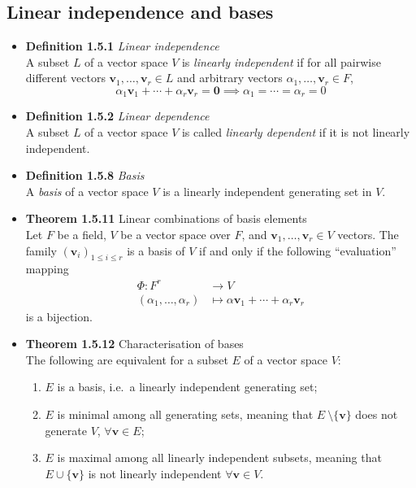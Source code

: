 \documentclass[11pt,a4paper]{article}
\begin{document}
\subsection{Linear independence and bases}

\begin{itemize}

    \item \textbf{Definition 1.5.1} \emph{Linear independence} \\
        A subset $L$ of a vector space $V$ is \emph{linearly independent}
        if for all pairwise different vectors
        $\mathbf{v}_1, \ldots, \mathbf{v}_r \in L$ and arbitrary vectors
        $\alpha_1, \ldots, \mathbf{v}_r \in F$,
        \[
            \alpha_1 \mathbf{v}_1 + \cdots + \alpha_r \mathbf{v}_r = \mathbf{0} \implies
            \alpha_1 = \cdots = \alpha_r = 0
        \]

    \item \textbf{Definition 1.5.2} \emph{Linear dependence} \\
        A subset $L$ of a vector space $V$ is called \emph{linearly dependent} if it is not
        linearly independent.

    \item \textbf{Definition 1.5.8} \emph{Basis} \\
        A \emph{basis} of a vector space $V$ is a linearly independent generating set in $V$.

    \item \textbf{Theorem 1.5.11} Linear combinations of basis elements \\
        Let $F$ be a field, $V$ be a vector space over $F$, and
        $\mathbf{v}_1, \ldots, \mathbf{v}_r \in V$ vectors.
        The family ${(\mathbf{v}_i)}_{1 \leq i \leq r}$ is a basis of $V$ if and only if the
        following ``evaluation'' mapping
        \begin{align*}{}
            \Phi : F^r                    & \to V \\
            (\alpha_1, \ldots, \alpha_r)  & \mapsto \alpha\mathbf{v}_1 +
            \cdots + \alpha_r\mathbf{v}_r
        \end{align*}
        is a bijection.

    \item \textbf{Theorem 1.5.12} Characterisation of bases \\
        The following are equivalent for a subset $E$ of a vector space $V$:
        \begin{enumerate}
            \item $E$ is a basis, i.e.\ a linearly independent generating set;
            \item $E$ is minimal among all generating sets,
                meaning that $E \ \setminus \{\mathbf{v}\}$ does not generate $V$,
                $\forall \mathbf{v} \in E$;
            \item $E$ is maximal among all linearly independent subsets,
                meaning that $E \cup \{\mathbf{v}\}$ is not linearly independent
                $\forall \mathbf{v} \in V$.
        \end{enumerate}


\end{itemize}
\end{document}
